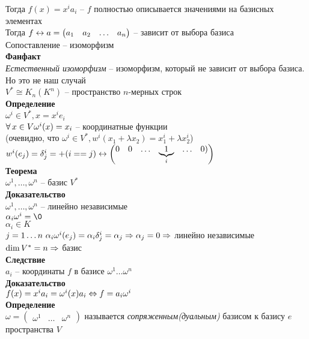 \documentclass[12pt]{article}
\begin{document}
Тогда $f(x) = x^i a_i$ -- $f$ полностью описывается значениями на базисных элементах\\
Тогда $f \lrto a = \begin{pmatrix}
    a_1 & a_2 & \ldots & a_n
\end{pmatrix}$ -- зависит от выбора базиса\\
Сопоставление -- изоморфизм\\
\textbf{Фанфакт}\\
\textit{Естественный изоморфизм} -- изоморфизм, который не зависит от выбора базиса. Но это не наш случай\\
$V^* \cong K_n (K^n)$ -- пространство $n$-мерных строк\\
\textbf{Определение}\\
$\omega^i \in V^*, x = x^i e_i$\\
$\fall x\in V \omega^i (x)=x_i$ -- координатные функции\\
(очевидно, что $\omega^i \in V^*, w^i(x_1+\lambda x_2) = x_1^i + \lambda x_2^i$)\\
$w^i (e_j) = \delta_j^i = +(i == j) \lrto \begin{pmatrix}
    0 & 0 & \ldots & \ub{i}1 & \ldots & 0)
\end{pmatrix}$\\
\textbf{Теорема}\\
$\omega^1, \ldots, \omega^n$ -- базис $V^*$\\
\textbf{Доказательство}\\
$\omega^1, \ldots, \omega^n$ -- линейно независимые\\
$\alpha_i \omega^i = \0$\\
$\alpha_i \in K$\\
$j=1\ldots n\ \alpha_i\omega^i(e_j)=\alpha_i \delta_j^i = \alpha_j \Rto \alpha_j = 0 \Rto $ линейно независимые\\
$\dim V^* = n \Rto $ базис\\
\textbf{Следствие}\\
$a_i$ -- координаты $f$ в базисе $\omega^1\dots\omega^n$\\
\textbf{Доказательство}\\
$f(x)=x^ia_i = \omega^i(x)a_i \LRto f=a_i\omega^i$\\
\textbf{Определение}\\
$\omega=\begin{pmatrix}
    \omega^1 & \ldots & \omega^n
\end{pmatrix}$ называется \textit{сопряженным(дуальным)} базисом к базису $e$ пространства $V$\\\\
\end{document}
